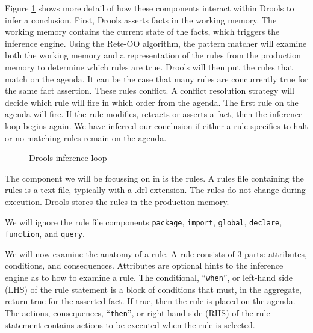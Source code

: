 Figure \ref{fig:Drools_inference_loop} shows more detail of how these components interact within Drools to infer a conclusion.
First, Drools asserts facts in the working memory.
The working memory contains the current state of the facts, which triggers the inference engine.
Using the Rete-OO algorithm, the pattern matcher will examine both the working memory and a representation of the rules from the production memory to determine which rules are true.
Drools will then put the rules that match on the agenda.
It can be the case that many rules are concurrently true for the same fact assertion.
These rules conflict.
A conflict resolution strategy will decide which rule will fire in which order from the agenda.
The first rule on the agenda will fire.
If the rule modifies, retracts or asserts a fact, then the inference loop begins again.
We have inferred our conclusion if either a rule specifies to halt or no matching rules remain on the agenda.

\begin{figure}
    \centering
    \caption{Drools inference loop}
    \label{fig:Drools_inference_loop}
\end{figure}

The component we will be focussing on in is the rules.
A rules file containing the rules is a text file, typically with a .drl extension.
The rules do not change during execution.
Drools stores the rules in the production memory.

We will ignore the rule file components \texttt{package}, \texttt{import}, \texttt{global}, \texttt{declare}, \texttt{function}, and \texttt{query}.

We will now examine the anatomy of a rule.
A rule consists of 3 parts: attributes, conditions, and consequences.
Attributes are optional hints to the inference engine as to how to examine a rule.
The conditional, ``\texttt{when}'', or left-hand side (LHS) of the rule statement is a block of conditions that must, in the aggregate, return true for the asserted fact. 
If true, then the rule is placed on the agenda.
The actions, consequences, ``\texttt{then}'', or right-hand side (RHS) of the rule statement contains actions to be executed when the rule is selected.


